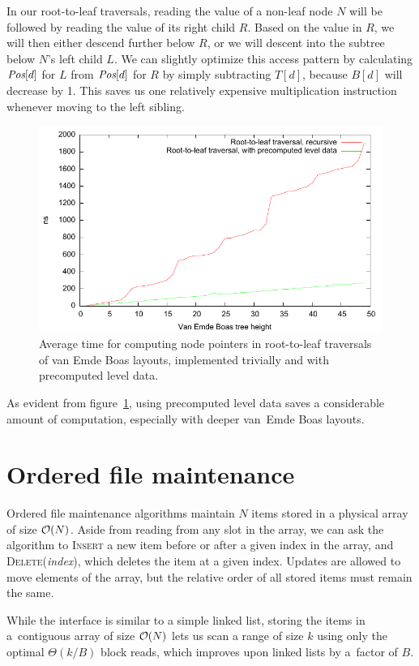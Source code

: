 In our root-to-leaf traversals, reading the value of a non-leaf node $N$ will be
followed by reading the value of its right child $R$. Based on the value in
$R$, we will then either descend further below $R$, or we will descent into
the subtree below $N$'s left child $L$.
We can slightly optimize this access pattern by calculating $\hbox{\it Pos}[d]$
for $L$ from $\hbox{\it Pos}[d]$ for $R$ by simply subtracting $T[d]$, because
$B[d]$ will decrease by 1. This saves us one relatively expensive multiplication
instruction whenever moving to the left sibling.

\begin{figure}
\centering
\includegraphics{img/veb-drilldown-speed}
\caption{Average time for computing node pointers in root-to-leaf traversals
	of van Emde Boas layouts, implemented trivially and with precomputed
	level data.}
\label{fig:veb_drilldown_speed}
\end{figure}
As evident from figure~\ref{fig:veb_drilldown_speed}, using precomputed level
data saves a considerable amount of computation, especially with deeper
van~Emde Boas layouts.

\section{Ordered file maintenance}
Ordered file maintenance algorithms maintain $N$ items stored in a physical
array of size $\mathcal{O}(N)$. Aside from reading from any slot in the array,
we can ask the algorithm to \textsc{Insert} a new item before or after
a given index in the array, and \textsc{Delete}(\emph{index}), which deletes
the item at a given index. Updates are allowed to move elements of the array,
but the relative order of all stored items must remain the same.

While the interface is similar to a simple linked list, storing the items
in a~contiguous array of size $\mathcal{O}(N)$ lets us scan a range of size $k$ using
only the optimal $\Theta(k/B)$ block reads, which improves upon linked lists
by a~factor of $B$.

